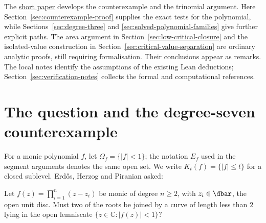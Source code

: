 \maketitle
\noteprovenance

\begin{abstract}
We give the rational estimates and geometric proof for the degree-seven
counterexample to Erd\H{o}s Problem~1041 constructed by \texttt{ani}.
A double-cover argument gives a Hausdorff-measure lower bound for every
connected set joining the two roots in its unique two-root component. For trinomials,
collinear roots and two sparse families we describe contained paths.
We also retain ordinary analytic arguments for critical-value criteria,
with their unformalised inputs identified beside the statements.
Critical-value moments, counterexamples to prescribed paths and
questions about flow-strip geometry complete the record.
\end{abstract}

The \href{erdos-1041-lemniscate-newton-flow.pdf}{short paper} develops the
counterexample and the trinomial argument. Here
Section~\ref{sec:counterexample-proof} supplies the exact tests for the
polynomial, while Sections~\ref{sec:degree-three} and
\ref{sec:solved-polynomial-families} give further explicit paths.
The area argument in Section~\ref{sec:low-critical-closure} and the
isolated-value construction in Section~\ref{sec:critical-value-separation}
are ordinary analytic proofs, still requiring formalisation. Their
conclusions appear as remarks. The local notes identify the assumptions
of the existing Lean deductions; Section~\ref{sec:verification-notes}
collects the formal and computational references.

\section{The question and the degree-seven counterexample}\label{sec:problem}

For a monic polynomial $f$, let $\Omega_f=\{|f|<1\}$; the notation
$E_f$ used in the segment arguments denotes the same open set. We write
$K_t(f)=\{|f|\le t\}$ for a closed sublevel. Erd\H{o}s, Herzog and Piranian \cite[Problem~5, p.~139]{ehp1958} asked:

\begin{problem}[Erd\H{o}s \#1041]\label{res:problem}
Let $f(z)=\prod_{i=1}^{n}(z-z_i)$ be monic of degree $n\ge2$, with
$z_i\in\dbar$, the open unit disc.  Must two of the roots be joined by a curve of length less than
$2$ lying in the open lemniscate $\{z\in\mathbb{C}:|f(z)|<1\}$?
\end{problem}

